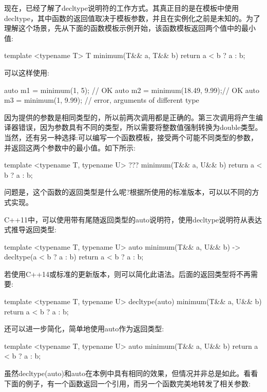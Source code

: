 现在，已经了解了decltype说明符的工作方式。其真正目的是在模板中使用decltype，其中函数的返回值取决于模板参数，并且在实例化之前是未知的。为了理解这个场景，先从下面的函数模板示例开始，该函数模板返回两个值中的最小值:

\begin{cpp}
template <typename T>
T minimum(T&& a, T&& b)
{
	return a < b ? a : b;
}
\end{cpp}

可以这样使用:

\begin{cpp}
auto m1 = minimum(1, 5); // OK
auto m2 = minimum(18.49, 9.99);// OK
auto m3 = minimum(1, 9.99);
                    // error, arguments of different type
\end{cpp}

因为提供的参数是相同类型的，所以前两次调用都是正确的。第三次调用将产生编译器错误，因为参数具有不同的类型，所以需要将整数值强制转换为double类型。当然，还有另一种选择:可以编写一个函数模板，接受两个可能不同类型的参数，并返回这两个参数中的最小值。如下所示:

\begin{cpp}
template <typename T, typename U>
??? minimum(T&& a, U&& b)
{
	return a < b ? a : b;
}
\end{cpp}

问题是，这个函数的返回类型是什么呢?根据所使用的标准版本，可以以不同的方式实现。

C++11中，可以使用带有尾随返回类型的auto说明符，使用decltype说明符从表达式推导返回类型:

\begin{cpp}
template <typename T, typename U>
auto minimum(T&& a, U&& b) -> decltype(a < b ? a : b)
{
	return a < b ? a : b;
}
\end{cpp}

若使用C++14或标准的更新版本，则可以简化此语法。后面的返回类型将不再需要:

\begin{cpp}
template <typename T, typename U>
decltype(auto) minimum(T&& a, U&& b)
{
	return a < b ? a : b;
}
\end{cpp}

还可以进一步简化，简单地使用auto作为返回类型:

\begin{cpp}
template <typename T, typename U>
auto minimum(T&& a, U&& b)
{
	return a < b ? a : b;
}
\end{cpp}

虽然decltype(auto)和auto在本例中具有相同的效果，但情况并非总是如此。看看下面的例子，有一个函数返回一个引用，而另一个函数完美地转发了相关参数:

